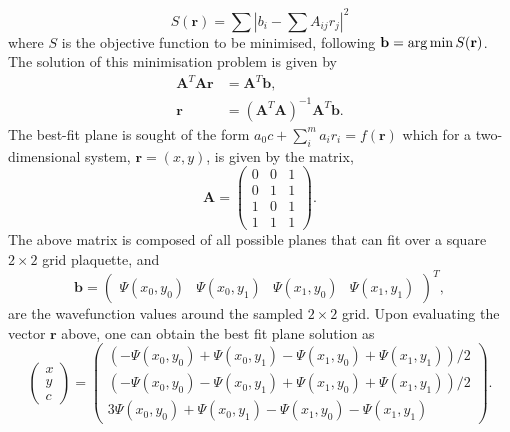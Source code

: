  \begin{equation}
 S(\mathbf{r}) = \displaystyle\sum |b_i - \displaystyle\sum A_{ij} r_j |^2
 \end{equation}
 where $S$ is the objective function to be minimised, following $\mathbf{b} = \operatorname*{arg\,min} S(\mathbf{r})$. The solution of this minimisation problem is given by
 \begin{subequations}
\begin{align}
    \mathbf{A} ^{T}\mathbf{A} \mathbf{r} &= \mathbf{A} ^{T}\mathbf{b}, \\
    \mathbf{r} &= (\mathbf{A}^{T}\mathbf{A})^{-1}\mathbf{A}^{T}\mathbf{b}.
\end{align}
\end{subequations}
The best-fit plane is sought of the form
$a_0 c + \displaystyle\sum\limits_{i}^{m} a_i r_i = f(\mathbf{r})$
which for a two-dimensional system, $\mathbf{r} = (x,y)$, is given by the matrix,
\begin{equation}
    \mathbf{A} = \left(
    \begin{array}{ccc}
        0 & 0 & 1 \\
        0 & 1 & 1 \\
        1 & 0 & 1 \\
        1 & 1 & 1
    \end{array}\right).
\end{equation}
The above matrix is composed of all possible planes that can fit over a square $2\times 2$ grid plaquette,
and
\begin{equation}
    \mathbf{b} = \left(
    \begin{array}{cccc}
        \Psi(x_0,y_0) & \Psi(x_0,y_1) & \Psi(x_1,y_0) & \Psi(x_1,y_1)
    \end{array} \right)^{T},
\end{equation}
are the wavefunction values around the sampled $2\times 2$ grid.
Upon evaluating the vector $\mathbf{r}$ above, one can obtain the best fit plane  solution as
\begin{equation}\left(
    \begin{array}{c}
        x \\
        y \\
        c
    \end{array}\right)
    = \left(
    \begin{array}{c}
        {\left( -\Psi(x_0,y_0) + \Psi(x_0,y_1) - \Psi(x_1,y_0) + \Psi(x_1,y_1) \right)}{/2} \\
        {\left( -\Psi(x_0,y_0) - \Psi(x_0,y_1) + \Psi(x_1,y_0) + \Psi(x_1,y_1) \right)}{/2} \\
        3\Psi(x_0,y_0) + \Psi(x_0,y_1) - \Psi(x_1,y_0) - \Psi(x_1,y_1)
    \end{array}\right).
\end{equation}

